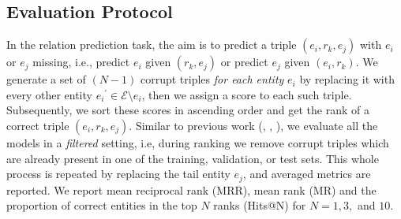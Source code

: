 \documentclass[11pt,a4paper]{article}
\begin{document}
\subsection{Evaluation Protocol}
\label{ssec:evaluation}
In the relation prediction task, the aim is to predict a triple \((e_i, r_k, e_j)\) with \(e_i\) or \(e_j\) missing, i.e., 
predict \(e_i\) given \((r_k, e_j)\) or predict \(e_j\) given \((e_i, r_k)\). 
We generate a set of $(N-1)$ corrupt triples \emph{for each entity} \(e_i\) by replacing it with every other entity \({e_i}^{\prime} \in \mathcal{E} \setminus e_i \), then we assign a score to each such triple. Subsequently, we sort these scores in ascending order and get the rank of a correct triple \((e_i, r_k, e_j)\). Similar to previous work (\cite{NIPS2013_5071}, \cite{nguyen2018novel},  \cite{dettmers2018convolutional}), we evaluate all the models in a \emph{filtered} setting, i.e, during ranking we remove corrupt triples which are already present in one of the training, validation, or test sets. 
This whole process is repeated by replacing the tail entity \(e_j\), and averaged metrics are reported. We report mean reciprocal rank (MRR), mean rank (MR) and the proportion of correct entities in the top $N$ ranks (Hits@N) for $N = 1, 3,$ and $10$.

\begin{comment}
\begin{table*}[t!]
\centering\small
\begin{tabular}{l|ccccccc}
\cline{1-8}
       &               &              & \multicolumn{4}{c}{\# Edges} \\ 
       \cline{4-7}
Dataset   &  \#Entities  & \#Relations  & Trainig  & Validation  & Test & Total & \#Isolated nodes \\ 
\hline
WN18RR    & 40,943 & 11  & 86,835   & 3034   & 3134   & 93,003   & 384 \\ 
FB15k-237 & 14,541 & 237 & 272,115  & 17,535 & 20,466 & 310,116  & 36 \\ 
NELL-995  & 75,492 & 200 & 149,678  & 543    & 3992   & 154,213  & 1060 \\
Kinship   & 104    & 25  & 8544     & 1068   & 1074   & 10,686   & 0 \\
UMLS      & 135    & 46  & 5216     & 652    & 661    & 6529     & 4 \\
\hline

\end{tabular}
\caption{Dataset statistics
  }
  \label{tb:datasets}
\end{table*}
\end{comment}
\end{document}
